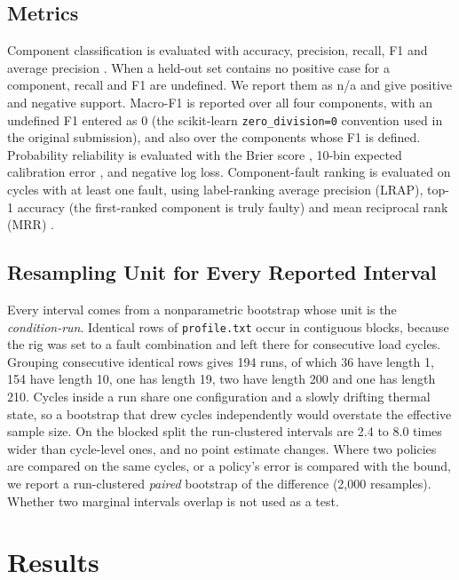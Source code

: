 \documentclass[journal]{IEEEtran}
\begin{document}
\subsection{Metrics}

Component classification is evaluated with accuracy, precision, recall, F1 and
average precision \cite{Davis2006PRvsROC,Saito2015PRPlot,Fawcett2006ROC}. When a
held-out set contains no positive case for a component, recall and F1 are
undefined. We report them as n/a and give positive and negative support. Macro-F1 is
reported over all four components, with an undefined F1 entered as 0 (the
scikit-learn \texttt{zero\_division=0} convention used in the original submission),
and also over the components whose F1 is defined. Probability reliability is evaluated
with the Brier score \cite{Brier1950Verification}, 10-bin expected calibration error
\cite{Naeini2015BayesianBinning,Guo2017Calibration}, and negative log loss.
Component-fault ranking is evaluated on cycles with at least one fault, using
label-ranking average precision (LRAP), top-1 accuracy (the first-ranked component
is truly faulty) and mean reciprocal rank (MRR)
\cite{Tsoumakas2007MultiLabel,Zhang2014MultiLabelReview}.

\subsection{Resampling Unit for Every Reported Interval}
\label{sec:resampling}

Every interval comes from a nonparametric bootstrap whose unit is the
\emph{condition-run}. Identical rows of \texttt{profile.txt} occur in contiguous
blocks, because the rig was set to a fault combination and left there for
consecutive load cycles. Grouping consecutive identical rows gives 194 runs, of which 36 have length 1, 154 have length 10, one has length 19, two have length 200 and one has length 210. Cycles inside a run share one configuration and a slowly drifting thermal
state, so a bootstrap that drew cycles independently would overstate the effective
sample size. On the blocked split the run-clustered intervals are 2.4 to 8.0 times
wider than cycle-level ones, and no point estimate changes. Where two policies are
compared on the same cycles, or a policy's error is compared with the bound, we
report a run-clustered \emph{paired} bootstrap of the difference (2{,}000
resamples). Whether two marginal intervals overlap is not used as a test.

\section{Results}
\label{sec:results}
\end{document}
